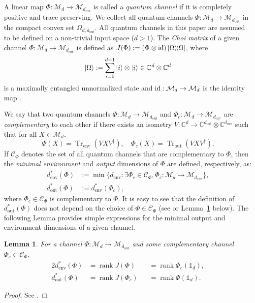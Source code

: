 \documentclass[a4paper,onecolumn,10pt,accepted=2022-07-11]{quantumarticle}
\newcommand{\M}[1]{\mathcal{M}_{#1}}
\newcommand{\C}[1]{\mathbb{C}^{#1}}
\newcommand{\env}{\operatorname{env}}
\newcommand{\out}{\operatorname{out}}
\newtheorem{lemma}[theorem]{Lemma}
\theoremstyle{definition}
\newcommand{\iden}{\mathbb{1}}
\begin{document}
A linear map $\Phi:\M{d}\to \M{d_{\out}}$ is called a \emph{quantum channel} if it is completely positive and trace preserving. We collect all quantum channels $\Phi:\M{d}\to\M{d_{\out}}$ in the compact convex set $\Omega_{d,d_{\out}}$. All quantum channels in this paper are assumed to be defined on a non-trivial input space ($d>1$). The \emph{Choi matrix} of a given channel $\Phi:\M{d}\to\M{d_{\out}}$ is defined as $J(\Phi) := ( \Phi \otimes {\rm{id}})\ketbra{\Omega}$, where
\begin{equation}
\ket{\Omega} := \sum_{i=0}^{d-1} \ket{i}\otimes \ket{i}\in {\mathbb{C}}^d \otimes {\mathbb{C}}^d    
\end{equation}
is a maximally entangled unnormalized state and ${\rm{id}}:\M{d}\rightarrow \M{d}$ is the identity map \cite{Choi1975iso, Jamiokowski1972iso}.

We say that two quantum channels $\Phi:\M{d}\rightarrow \M{d_{\out}}$ and $\Phi_c:\M{d}\rightarrow \M{d_{\operatorname{env}}}$ are \emph{complementary} to each other if there exists an isometry $V:\C{d}\rightarrow \C{d_{\out}}\otimes \C{d_{\operatorname{env}}}$ such that for all $X\in\M{d}$,
\begin{equation}\label{eq:complementary}
\Phi(X)=\operatorname{Tr}_{\operatorname{env}}(VXV^\dagger), \quad
\Phi_c (X) = \operatorname{Tr}_{\out}(VXV^\dagger).
\end{equation}   
If $\mathcal{C}_\Phi$ 
denotes the set of all quantum channels that are complementary to $\Phi$, then the \emph{minimal environment} and \emph{output} dimensions of $\Phi$ are defined, respectively, as:
\begin{align}
    d^{*}_{\operatorname{env}}(\Phi) &:=  \min \{d_{\operatorname{env}}: \exists\Phi_c\in \mathcal{C}_{\Phi}, \Phi_c:\M{d}\rightarrow \M{d_{\env}} \}, \nonumber \\
    d^{*}_{\out} (\Phi) &:= d^{*}_{\env}(\Phi_c),
\end{align}
where $\Phi_c\in\mathcal{C}_\Phi$ is complementary to $\Phi$. It is easy to see that the definition of $d^*_{\out}(\Phi)$ does not depend on the choice of $\Phi\in\mathcal{C}_\Phi$ (see \cite[Remark 2.1]{Singh2022detecting} or Lemma~\ref{lemma:minimal} below). The following Lemma provides simple expressions for the minimal output and environment dimensions of a given channel.

\begin{lemma}\label{lemma:minimal}
For a channel $\Phi:\M{d}\rightarrow \M{d_{\out}}$ and some complementary channel $\Phi_c\in \mathcal{C}_\Phi$,
\begin{alignat*}{2}
    d^{*}_{\operatorname{env}}(\Phi)&=\operatorname{rank}J(\Phi)&&=\operatorname{rank}\Phi_c(\iden_d), \\
    d^{*}_{\out} (\Phi)&=\operatorname{rank}J(\Phi_c)&&=\operatorname{rank}\Phi(\iden_d).
\end{alignat*}
\end{lemma}
\begin{proof}
See \cite[Lemma 2.2]{Singh2022detecting}.
\end{proof}
\end{document}

